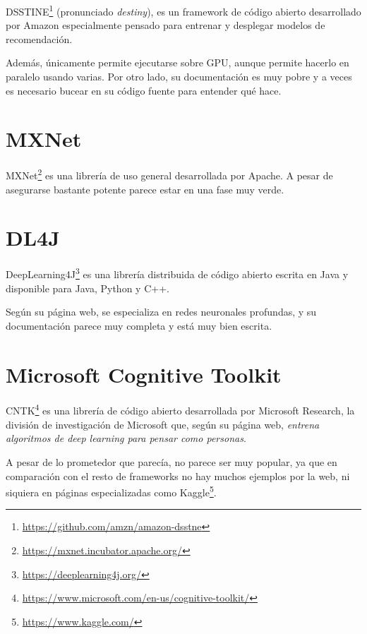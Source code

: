 DSSTINE\footnote{\url{https://github.com/amzn/amazon-dsstne}} (pronunciado \textit{destiny}), es un framework de código abierto desarrollado por Amazon especialmente pensado para entrenar y desplegar modelos de recomendación.

\bigskip

Además, únicamente permite ejecutarse sobre GPU, aunque permite hacerlo en paralelo usando varias. Por otro lado, su documentación es muy pobre y a veces es necesario bucear en su código fuente para entender qué hace.

\section{MXNet}

MXNet\footnote{\url{https://mxnet.incubator.apache.org/}} es una librería de uso general desarrollada por Apache. A pesar de asegurarse bastante potente parece estar en una fase muy verde.

\section{DL4J}

DeepLearning4J\footnote{\url{https://deeplearning4j.org/}} es una librería distribuida de código abierto escrita en Java y disponible para Java, Python y C++.

\bigskip

Según su página web, se especializa en redes neuronales profundas, y su documentación parece muy completa y está muy bien escrita.

\section{Microsoft Cognitive Toolkit}

CNTK\footnote{\url{https://www.microsoft.com/en-us/cognitive-toolkit/}} es una librería de código abierto desarrollada por Microsoft Research, la división de investigación de Microsoft que, según su página web, \textit{entrena algoritmos de deep learning para pensar como personas}.

\bigskip

A pesar de lo prometedor que parecía, no parece ser muy popular, ya que en comparación con el resto de frameworks no hay muchos ejemplos por la web, ni siquiera en páginas especializadas como Kaggle\footnote{\url{https://www.kaggle.com/}}.
